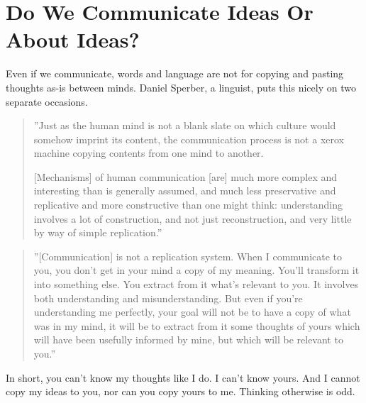 \documentclass[graybox,envcountchap,sectrefs]{svmono}
\begin{document}
\section{Do We Communicate Ideas Or About Ideas?}
\label{c1-s7}
Even if we communicate, words and language are not for copying and pasting thoughts as-is between minds. Daniel Sperber, a linguist, puts this nicely on two separate occasions.

\begin{quote}
''Just as the human mind is not a blank slate on which culture would somehow imprint its content, the communication process is not a xerox machine copying contents from one mind to another. 

[Mechanisms] of human communication [are] much more complex and interesting than is generally assumed, and much less preservative and replicative and more constructive than one might think: understanding involves a lot of construction, and not just reconstruction, and very little by way of simple replication.'' \cite{Sperber2005}
\end{quote}

\begin{quote}
''[Communication] is not a replication system. When I communicate to you, you don’t get in your mind a copy of my meaning. You'll transform it into something else. You extract from it what’s relevant to you. It involves both understanding and misunderstanding. But even if you’re understanding me perfectly, your goal will not be to have a copy of what was in my mind, it will be to extract from it some thoughts of yours which will have been usefully informed by mine, but which will be relevant to you.'' \cite{Sperber2017}
\end{quote}

In short, you can't know my thoughts like I do. I can't know yours. And I cannot copy my ideas to you, nor can you copy yours to me. Thinking otherwise is odd. 
\end{document}
